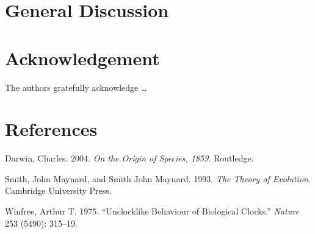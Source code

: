 \documentclass[12pt, a4paper]{report} %
\newlength{\cslhangindent}
\newenvironment{CSLReferences}[2] %
 {%
  \setlength{\parindent}{0pt}
  \ifodd #1 \everypar{\setlength{\hangindent}{\cslhangindent}}\ignorespaces\fi
  \ifnum #2 > 0
  \setlength{\parskip}{#2\baselineskip}
  \fi
 }%
 {}
\begin{document}
\chapter*{General Discussion}
\parindent=5.3mm

\chapter*{Acknowledgement}

The authors gratefully acknowledge \ldots{}

\chapter*{References}

\hypertarget{refs}{}
\begin{CSLReferences}{1}{0}
\leavevmode{}%
Darwin, Charles. 2004. \emph{On the Origin of Species, 1859}. Routledge.

\leavevmode{}%
Smith, John Maynard, and Smith John Maynard. 1993. \emph{The Theory of
Evolution}. Cambridge University Press.

\leavevmode{}%
Winfree, Arthur T. 1975. {``Unclocklike Behaviour of Biological
Clocks.''} \emph{Nature} 253 (5490): 315--19.

\end{CSLReferences}



\end{document}

